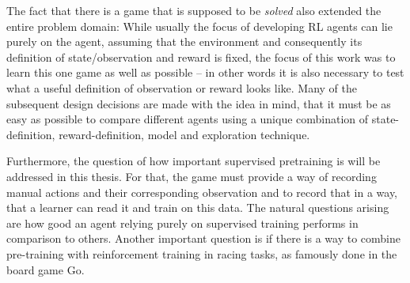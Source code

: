 The fact that there is a game that is supposed to be \textit{solved} also extended the entire problem domain: While usually the focus of developing RL agents can lie purely on the agent, assuming that the environment and consequently its definition of state/observation and reward is fixed, the focus of this work was to learn this one game as well as possible -- in other words it is also necessary to test what a useful definition of observation or reward looks like. Many of the subsequent design decisions are made with the idea in mind, that it must be as easy as possible to compare different agents using a unique combination of state-definition, reward-definition, model and exploration technique. 

Furthermore, the question of how important supervised pretraining is will be addressed in this thesis. For that, the game must provide a way of recording manual actions and their corresponding observation and to record that in a way, that a learner can read it and train on this data. The natural questions arising are how good an agent relying purely on supervised training performs in comparison to others. Another important question is if there is a way to combine pre-training with reinforcement training in racing tasks, as famously done in the board game Go\cite{silver_mastering_2016}.

%
%



